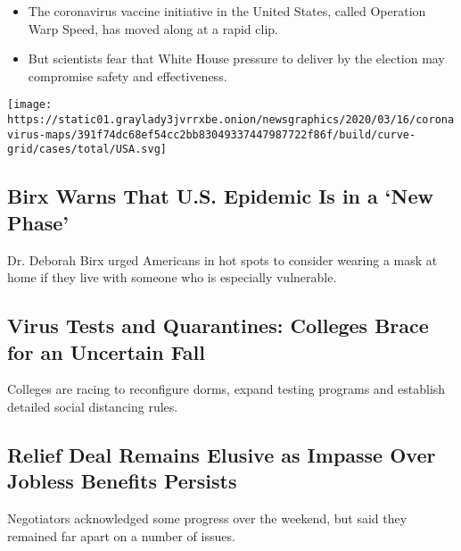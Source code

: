 \begin{itemize}
\tightlist
\item
  The coronavirus vaccine initiative in the United States, called
  Operation Warp Speed, has moved along at a rapid clip.
\item
  But scientists fear that White House pressure to deliver by the
  election may compromise safety and effectiveness.
\end{itemize}

\texttt{[image: https://static01.graylady3jvrrxbe.onion/newsgraphics/2020/03/16/coronavirus-maps/391f74dc68ef54cc2bb83049337447987722f86f/build/curve-grid/cases/total/USA.svg]}

\href{/2020/08/02/world/coronavirus-covid-19.html}{}

\hypertarget{birx-warns-that-us-epidemic-is-in-a-new-phase}{%
\subsection{Birx Warns That U.S. Epidemic Is in a `New
Phase'}\label{birx-warns-that-us-epidemic-is-in-a-new-phase}}

Dr. Deborah Birx urged Americans in hot spots to consider wearing a mask
at home if they live with someone who is especially vulnerable.

\href{/2020/08/02/us/covid-college-reopening.html}{}

\hypertarget{virus-tests-and-quarantines-colleges-brace-for-an-uncertain-fall}{%
\subsection{Virus Tests and Quarantines: Colleges Brace for an Uncertain
Fall}\label{virus-tests-and-quarantines-colleges-brace-for-an-uncertain-fall}}

Colleges are racing to reconfigure dorms, expand testing programs and
establish detailed social distancing rules.

\href{/2020/08/02/us/politics/coronavirus-jobless-aid.html}{}

\hypertarget{relief-deal-remains-elusive-as-impasse-over-jobless-benefits-persists}{%
\subsection{Relief Deal Remains Elusive as Impasse Over Jobless Benefits
Persists}\label{relief-deal-remains-elusive-as-impasse-over-jobless-benefits-persists}}

Negotiators acknowledged some progress over the weekend, but said they
remained far apart on a number of issues.

